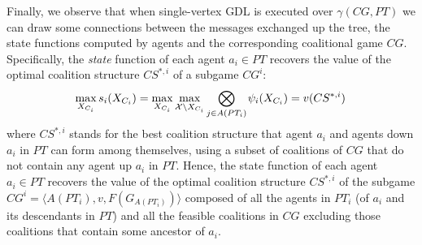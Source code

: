 \documentclass{aamas2012}
\begin{document}


Finally, we observe that when single-vertex GDL is executed over
$\gamma(CG,PT)$ we can draw some connections between the messages exchanged up
the tree, the state functions computed by agents and the corresponding
coalitional game $CG$.
Specifically, the \emph{state}
function of each agent $a_i\in PT$ recovers the value of the optimal
coalition structure $CS^{*,i}$ of a subgame $CG^i$:
\begin{equation}
\hspace{-0.02in}\max_{X_{C_i}} s_i(X_{C_i}) =
\max_{X_{C_i}}\max\limits_{\mathcal{X}\setminus X_{C_i}} \bigotimes_{j\in
A(PT_i)}\hspace{-0.01in} \psi_i(X_{C_i}) =v(CS^{*,i})
\label{eq:gdl_2_optimal_coalition_structure}
\vspace{-0.05in}
\end{equation}
where $CS^{*,i}$ stands for the best
coalition structure that agent $a_i$ and agents down $a_i$ in $PT$ can form
among themselves, using a subset of coalitions of $CG$ that do not contain any
agent up $a_i$ in $PT$. Hence, the state function of each agent $a_i\in PT$
recovers the value of the optimal coalition structure $CS^{*,i}$ of the subgame
$CG^i= \langle A(PT_i), v, F(G_{A(PT_i)}) \rangle$ composed of all the agents
in $PT_i$ (of $a_i$ and its descendants in $PT$) and all the feasible coalitions in $CG$
excluding those coalitions that contain some ancestor of $a_i$.
\end{document}
